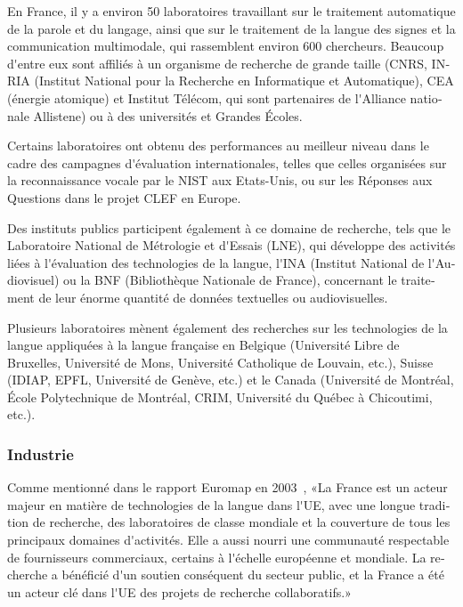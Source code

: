 \begin{french}
\begin{multicols}{2}
En France, il y a environ 50 laboratoires travaillant sur le traitement
automatique de la parole et du langage, ainsi que sur le traitement de
la langue des signes et la communication multimodale, qui
rassemblent environ 600 chercheurs. Beaucoup d{\mbox '}entre eux sont affiliés
à un organisme de recherche de grande taille (CNRS, INRIA (Institut
National pour la Recherche en Informatique et Automatique), CEA
(énergie atomique) et Institut Télécom, qui sont partenaires de
l{\mbox '}Alliance nationale Allistene) ou à des universités et Grandes Écoles.

Certains laboratoires ont obtenu des performances au meilleur niveau
dans le cadre des campagnes d{\mbox '}évaluation internationales, telles que
celles organisées sur la reconnaissance vocale par le NIST aux
Etats-Unis, ou sur les Réponses aux Questions dans le projet CLEF en
Europe.

Des instituts publics participent également à ce domaine de
recherche, tels que le Laboratoire National de Métrologie et d{\mbox '}Essais
(LNE), qui développe des activités liées à l{\mbox '}évaluation des
technologies de la langue, l{\mbox '}INA (Institut National de l{\mbox '}Audiovisuel)
ou la BNF (Bibliothèque Nationale de France), concernant le traitement
de leur énorme quantité de données textuelles ou audiovisuelles.

Plusieurs laboratoires mènent également des recherches sur les
technologies de la langue appliquées à la langue française en Belgique
(Université Libre de Bruxelles, Université de Mons, Université
Catholique de Louvain, etc.), Suisse (IDIAP, EPFL, Université de
Genève, etc.) et le Canada (Université de Montréal, École
Polytechnique de Montréal, CRIM, Université du Québec à Chicoutimi,
etc.).

\subsubsection{Industrie}

Comme mentionné dans le rapport Euromap en 2003~\cite{euromap}, «La
France est un acteur majeur en matière de technologies de la langue
dans l{\mbox '}UE, avec une longue tradition de recherche, des laboratoires de
classe mondiale et la couverture de tous les principaux domaines
d{\mbox '}activités. Elle a aussi nourri une communauté respectable de
fournisseurs commerciaux, certains à l{\mbox '}échelle européenne et
mondiale. La recherche a bénéficié d{\mbox '}un soutien conséquent du secteur
public, et la France a été un acteur clé dans l{\mbox '}UE des projets de
recherche collaboratifs.»


\end{multicols}
\end{french}
